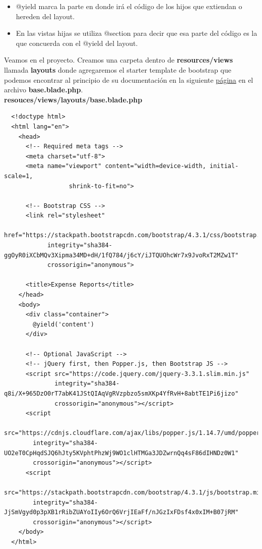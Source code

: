 \documentclass{article}
\begin{document}
\begin{itemize}
  \item @yield marca la parte en donde irá el código de los hijos que extiendan
    o hereden del layout.
  \item En las vistas hijas se utiliza @section para decir que esa parte del
    código es la que concuerda con el @yield del layout.
\end{itemize}

Veamos en el proyecto. Creamos una carpeta dentro de \textbf{resources/views}
llamada \textbf{layouts} donde agregaremos el starter template de bootstrap que
podemos encontrar al principio de su documentación en la siguiente
\href{https://getbootstrap.com/docs/4.3/getting-started/introduction/}{página}
en el archivo \textbf{base.blade.php}.\\

\textbf{resouces/views/layouts/base.blade.php}
\begin{verbatim}
  <!doctype html>
  <html lang="en">
    <head>
      <!-- Required meta tags -->
      <meta charset="utf-8">
      <meta name="viewport" content="width=device-width, initial-scale=1,
                  shrink-to-fit=no">

      <!-- Bootstrap CSS -->
      <link rel="stylesheet"
            href="https://stackpath.bootstrapcdn.com/bootstrap/4.3.1/css/bootstrap.min.css"
            integrity="sha384-ggOyR0iXCbMQv3Xipma34MD+dH/1fQ784/j6cY/iJTQUOhcWr7x9JvoRxT2MZw1T"
            crossorigin="anonymous">

      <title>Expense Reports</title>
    </head>
    <body>
      <div class="container">
        @yield('content')
      </div>

      <!-- Optional JavaScript -->
      <!-- jQuery first, then Popper.js, then Bootstrap JS -->
      <script src="https://code.jquery.com/jquery-3.3.1.slim.min.js"
              integrity="sha384-q8i/X+965DzO0rT7abK41JStQIAqVgRVzpbzo5smXKp4YfRvH+8abtTE1Pi6jizo"
              crossorigin="anonymous"></script>
      <script
        src="https://cdnjs.cloudflare.com/ajax/libs/popper.js/1.14.7/umd/popper.min.js"
        integrity="sha384-UO2eT0CpHqdSJQ6hJty5KVphtPhzWj9WO1clHTMGa3JDZwrnQq4sF86dIHNDz0W1"
        crossorigin="anonymous"></script>
      <script
        src="https://stackpath.bootstrapcdn.com/bootstrap/4.3.1/js/bootstrap.min.js"
        integrity="sha384-JjSmVgyd0p3pXB1rRibZUAYoIIy6OrQ6VrjIEaFf/nJGzIxFDsf4x0xIM+B07jRM"
        crossorigin="anonymous"></script>
    </body>
  </html>
\end{verbatim}
\end{document}
